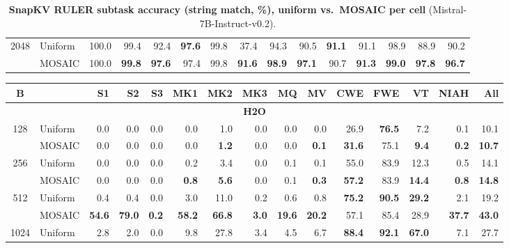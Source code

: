 \begin{table}[tp]
\begin{tabular}{@{} c l rrrrrrrrrrrrr @{}}
    \cmidrule(l){1-15}
    \multirow{2}{*}{2048} & Uniform & 100.0 & 99.4 & 92.4 & \textbf{97.6} & 99.8 & 37.4 & 94.3 & 90.5 & \textbf{91.1} & 91.1 & 98.9 & 88.9 & 90.2 \\
     & MOSAIC & 100.0 & \textbf{99.8} & \textbf{97.6} & 97.4 & 99.8 & \textbf{91.6} & \textbf{98.9} & \textbf{97.1} & 90.7 & \textbf{91.3} & \textbf{99.0} & \textbf{97.8} & \textbf{96.7} \\
    \bottomrule
  \end{tabular}
  \caption{\textbf{SnapKV RULER subtask accuracy (string match, \%), uniform vs.\ MOSAIC per cell} (Mistral-7B-Instruct-v0.2).}
  \label{tab:app-ruler-mistral-snapkv}
\end{table}

\begin{table}[tp]
  \centering
  \scriptsize
  \setlength{\tabcolsep}{4pt}
  \renewcommand{\arraystretch}{0.92}
  \begin{tabular}{@{} c l rrrrrrrrrrrrr @{}}
    \toprule
    \textbf{B} & & \textbf{S1} & \textbf{S2} & \textbf{S3} & \textbf{MK1} & \textbf{MK2} & \textbf{MK3} & \textbf{MQ} & \textbf{MV} & \textbf{CWE} & \textbf{FWE} & \textbf{VT} & \textbf{NIAH} & \textbf{All} \\
    \midrule
    \multicolumn{15}{c}{\textbf{H2O}} \\
    \midrule
    \multirow{2}{*}{128} & Uniform & 0.0 & 0.0 & 0.0 & 0.0 & 1.0 & 0.0 & 0.0 & 0.0 & 26.9 & \textbf{76.5} & 7.2 & 0.1 & 10.1 \\
     & MOSAIC & 0.0 & 0.0 & 0.0 & 0.0 & \textbf{1.2} & 0.0 & 0.0 & \textbf{0.1} & \textbf{31.6} & 75.1 & \textbf{9.4} & \textbf{0.2} & \textbf{10.7} \\
    \cmidrule(l){1-15}
    \multirow{2}{*}{256} & Uniform & 0.0 & 0.0 & 0.0 & 0.2 & 3.4 & 0.0 & 0.1 & 0.1 & 55.0 & 83.9 & 12.3 & 0.5 & 14.1 \\
     & MOSAIC & 0.0 & 0.0 & 0.0 & \textbf{0.8} & \textbf{5.6} & 0.0 & 0.1 & \textbf{0.3} & \textbf{57.2} & 83.9 & \textbf{14.4} & \textbf{0.8} & \textbf{14.8} \\
    \cmidrule(l){1-15}
    \multirow{2}{*}{512} & Uniform & 0.4 & 0.4 & 0.0 & 3.0 & 11.0 & 0.2 & 0.6 & 0.8 & \textbf{75.2} & \textbf{90.5} & \textbf{29.2} & 2.1 & 19.2 \\
     & MOSAIC & \textbf{54.6} & \textbf{79.0} & \textbf{0.2} & \textbf{58.2} & \textbf{66.8} & \textbf{3.0} & \textbf{19.6} & \textbf{20.2} & 57.1 & 85.4 & 28.9 & \textbf{37.7} & \textbf{43.0} \\
    \cmidrule(l){1-15}
    \multirow{2}{*}{1024} & Uniform & 2.8 & 2.0 & 0.0 & 9.8 & 27.8 & 3.4 & 4.5 & 6.7 & \textbf{88.4} & \textbf{92.1} & \textbf{67.0} & 7.1 & 27.7 \\

\end{tabular}
\end{table}
